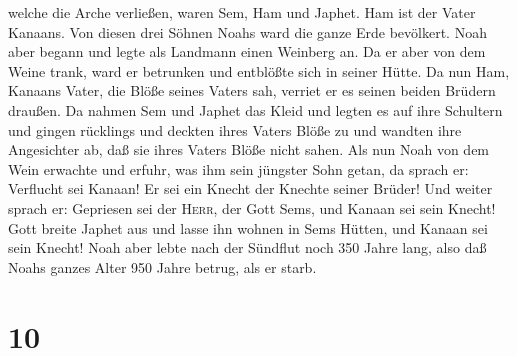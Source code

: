 welche die Arche verließen, waren Sem, Ham und Japhet. Ham ist der Vater
Kanaans.  Von diesen drei Söhnen Noahs ward die ganze
Erde bevölkert.  Noah aber begann und legte als Landmann
einen Weinberg an.  Da er aber von dem Weine trank, ward
er betrunken und entblößte sich in seiner Hütte.  Da nun
Ham, Kanaans Vater, die Blöße seines Vaters sah, verriet er es seinen
beiden Brüdern draußen.  Da nahmen Sem und Japhet das
Kleid und legten es auf ihre Schultern und gingen rücklings und deckten
ihres Vaters Blöße zu und wandten ihre Angesichter ab, daß sie ihres
Vaters Blöße nicht sahen.  Als nun Noah von dem Wein
erwachte und erfuhr, was ihm sein jüngster Sohn getan, 
da sprach er: Verflucht sei Kanaan! Er sei ein Knecht der Knechte seiner
Brüder!  Und weiter sprach er: Gepriesen sei der
\textsc{Herr}, der Gott Sems, und Kanaan sei sein Knecht!
 Gott breite Japhet aus und lasse ihn wohnen in Sems
Hütten, und Kanaan sei sein Knecht!  Noah aber lebte nach
der Sündflut noch 350 Jahre lang,  also daß Noahs ganzes
Alter 950 Jahre betrug, als er starb.

\hypertarget{section-9}{%
\section{10}\label{section-9}}

